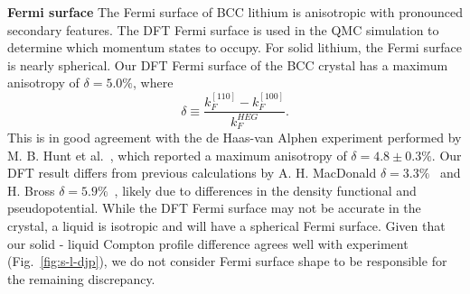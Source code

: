 \documentclass[aps,prb,showpacs,preprintnumbers,amsmath,amssymb,superscriptaddress,twocolumn]{revtex4-1}
\begin{document}



{\bf Fermi surface}  The Fermi surface of BCC lithium is anisotropic with pronounced secondary features. %
The DFT Fermi surface is used in the QMC simulation to determine which momentum states to occupy.
For solid lithium, the Fermi surface is nearly spherical. Our DFT Fermi surface of the BCC crystal has a maximum anisotropy of $\delta=5.0\%$, where
\begin{equation} \label{eq:ani-delta}
\delta \equiv \dfrac{k_F^{[110]} - k_F^{[100]}}{k_F^{HEG}}.
\end{equation}
This is in good agreement with the de Haas-van Alphen experiment performed by M. B. Hunt et al.~\cite{Hunt1989}, which reported a maximum anisotropy of $\delta=4.8\pm 0.3\%$. Our DFT result differs from previous calculations by A. H. MacDonald $\delta=3.3\%$~\cite{MacDonald1980} and H. Bross $\delta=5.9\%$~\cite{Bross2005}, likely due to differences in the density functional and pseudopotential.
While the DFT Fermi surface may not be accurate in the crystal,  a liquid is isotropic and will have a spherical Fermi surface.
Given that our solid - liquid Compton profile difference agrees well with experiment (Fig.~\ref{fig:s-l-djp}), we do not consider Fermi surface shape to be responsible for the remaining discrepancy.
\end{document}
